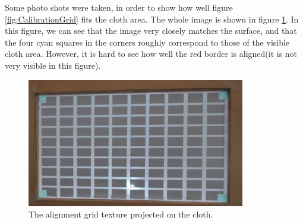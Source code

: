 \documentclass[]{article}
\begin{document}
Some photo shots were taken, in order to show how well figure \ref{fig:CalibrationGrid} fits the cloth area. The whole image is shown in figure \ref{fig:ProjectedCalibrationGrid}. In this figure, we can see that the image very closely matches the surface, and that the four cyan squares in the corners roughly correspond to those of the visible cloth area. However, it is hard to see how well the red border is aligned(it is not very visible in this figure). 

\begin{figure}[hbtp]
    \centering
    \includegraphics[width=0.85\textwidth]{figures/ProjectedCalibrationGridC2.jpg}
    \caption{The alignment grid texture projected on the cloth.}
    \label{fig:ProjectedCalibrationGrid}
\end{figure}
\end{document}

